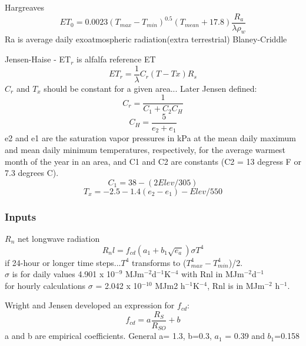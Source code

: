 \documentclass[hydrology,article,submit,moreauthors,pdftex]{Definitions/mdpi}
\begin{document}
Hargreaves \cite{hargreaves1982estimating}
\begin{equation}
ET_0 = 0.0023(T_{max}-T_{min})^{0.5}(T_{mean}+17.8) \frac{R_a}{\lambda \rho _w}
\end{equation}
Ra is average daily exoatmospheric radiation(extra terrestrial)
Blaney-Criddle \cite{asce2005asce}

Jensen-Haise \cite{asce2005asce} - ET$_r$ is alfalfa reference ET
\begin{equation}
ET_r = \frac{1}{\lambda} C_r(T-Tx)R_s
\end{equation}
$C_r$ and $T_x$ should be constant for a given area...
Later Jensen defined:
\begin{equation}
C_r = \frac{1}{C_1+C_2C_H}
\end{equation}
\begin{equation}
C_H = \frac{5}{e_2 + e_1}
\end{equation}
e2 and e1 are the saturation vapor pressures in kPa at the mean daily maximum and mean daily minimum temperatures, respectively, for the average warmest month of the year in an area, and C1 and C2 are constants (C2 = 13 degress F or 7.3 degrees C).
\begin{equation}
C_1 = 38-(2Elev/305)
\end{equation}
\begin{equation}
T_x = -2.5 - 1.4 (e_2-e_1) - Elev/550
\end{equation}



\subsubsection{Inputs}

$R_n$ net longwave radiation
\begin{equation}
R_nl = f_{cd} (a_1+b_1\sqrt{e_a})\sigma T^4
\end{equation}
if 24-hour or longer time steps...$T^4$ transforms to ($T^4_{max}-T^4_{min}$)/2. \\
$\sigma$ is for daily values 4.901 x 10$^{-9}$ MJm$^{-2}$d$^{-1}$K$^{-4}$ with Rnl in MJm$^{-2}$d$^{-1}$ \\
for hourly calculations $\sigma$ = 2.042 x 10$^{-10}$ MJm2 h$^{-1}$K$^{-4}$, Rnl is in MJm$^{-2}$ h$^{-1}$.

Wright and Jensen \cite{wright1972peak} developed an expression for $f_{cd}$:
\begin{equation}
f_{cd} = a \frac{R_S}{R_{SO}} + b
\end{equation}
a and b are empirical coefficients. General a= 1.3, b=0.3, $a_1$ = 0.39 and $b_1$=0.158
\end{document}
